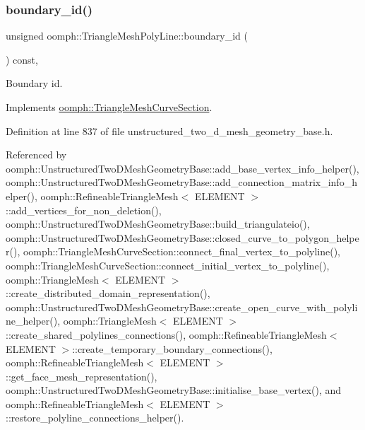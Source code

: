 \mbox{\label{classoomph_1_1TriangleMeshPolyLine_af4fa1e14f3e2f8d16e085da928272872}} 
\subsubsection{\texorpdfstring{boundary\+\_\+id()}{boundary\_id()}}
{\footnotesize\ttfamily unsigned oomph\+::\+Triangle\+Mesh\+Poly\+Line\+::boundary\+\_\+id (\begin{DoxyParamCaption}{ }\end{DoxyParamCaption}) const\hspace{0.3cm}{\ttfamily [inline]}, {\ttfamily [virtual]}}



Boundary id. 



Implements \hyperlink{classoomph_1_1TriangleMeshCurveSection_a2e6d22017ce7abe7e84e3f16360f5444}{oomph\+::\+Triangle\+Mesh\+Curve\+Section}.



Definition at line 837 of file unstructured\+\_\+two\+\_\+d\+\_\+mesh\+\_\+geometry\+\_\+base.\+h.



Referenced by oomph\+::\+Unstructured\+Two\+D\+Mesh\+Geometry\+Base\+::add\+\_\+base\+\_\+vertex\+\_\+info\+\_\+helper(), oomph\+::\+Unstructured\+Two\+D\+Mesh\+Geometry\+Base\+::add\+\_\+connection\+\_\+matrix\+\_\+info\+\_\+helper(), oomph\+::\+Refineable\+Triangle\+Mesh$<$ E\+L\+E\+M\+E\+N\+T $>$\+::add\+\_\+vertices\+\_\+for\+\_\+non\+\_\+deletion(), oomph\+::\+Unstructured\+Two\+D\+Mesh\+Geometry\+Base\+::build\+\_\+triangulateio(), oomph\+::\+Unstructured\+Two\+D\+Mesh\+Geometry\+Base\+::closed\+\_\+curve\+\_\+to\+\_\+polygon\+\_\+helper(), oomph\+::\+Triangle\+Mesh\+Curve\+Section\+::connect\+\_\+final\+\_\+vertex\+\_\+to\+\_\+polyline(), oomph\+::\+Triangle\+Mesh\+Curve\+Section\+::connect\+\_\+initial\+\_\+vertex\+\_\+to\+\_\+polyline(), oomph\+::\+Triangle\+Mesh$<$ E\+L\+E\+M\+E\+N\+T $>$\+::create\+\_\+distributed\+\_\+domain\+\_\+representation(), oomph\+::\+Unstructured\+Two\+D\+Mesh\+Geometry\+Base\+::create\+\_\+open\+\_\+curve\+\_\+with\+\_\+polyline\+\_\+helper(), oomph\+::\+Triangle\+Mesh$<$ E\+L\+E\+M\+E\+N\+T $>$\+::create\+\_\+shared\+\_\+polylines\+\_\+connections(), oomph\+::\+Refineable\+Triangle\+Mesh$<$ E\+L\+E\+M\+E\+N\+T $>$\+::create\+\_\+temporary\+\_\+boundary\+\_\+connections(), oomph\+::\+Refineable\+Triangle\+Mesh$<$ E\+L\+E\+M\+E\+N\+T $>$\+::get\+\_\+face\+\_\+mesh\+\_\+representation(), oomph\+::\+Unstructured\+Two\+D\+Mesh\+Geometry\+Base\+::initialise\+\_\+base\+\_\+vertex(), and oomph\+::\+Refineable\+Triangle\+Mesh$<$ E\+L\+E\+M\+E\+N\+T $>$\+::restore\+\_\+polyline\+\_\+connections\+\_\+helper().


